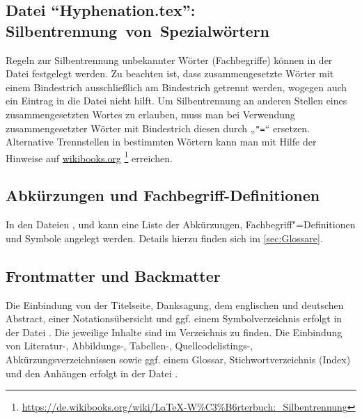 \subsection[Datei \enquote{Hyphenation.tex}: Silbentrennung von Spezialwörtern]{Datei \enquote{Hyphenation.tex}: \mbox{Silbentrennung von Spezialwörtern}}%
%
\label{sec:Hyphenation}
%
Regeln zur Silbentrennung unbekannter Wörter (\zB Fachbegriffe)
können in der Datei  festgelegt werden.
Zu beachten ist, dass zusammengesetzte Wörter mit einem Bindestrich
ausschließlich am Bindestrich getrennt werden,
wogegen auch ein Eintrag in die Datei  nicht hilft.
Um Silbentrennung an anderen Stellen eines zusammengesetzten Wortes zu erlauben,
muss man bei Verwendung zusammengesetzter Wörter mit Bindestrich diesen durch „\verb+"=+“ ersetzen.
Alternative Trennstellen in bestimmten Wörtern kann man mit Hilfe der Hinweise auf 
\href{https://de.wikibooks.org/wiki/LaTeX-W%C3%B6rterbuch:_Silbentrennung}{wikibooks.org}%
\footnote{\url{https://de.wikibooks.org/wiki/LaTeX-W%C3%B6rterbuch:_Silbentrennung}}
erreichen.


\subsection[Abkürzungen und Fachbegriff-Definitionen]{Abkürzungen und Fachbegriff-Definitionen}%
%
%
%
%
\label{sec:Abkuerzungen}
%
In den Dateien
,
 und
kann eine Liste der Abkürzungen, Fachbegriff"=Definitionen und Symbole angelegt werden.
Details hierzu finden sich im \cref{sec:Glossare}.


\subsection[Frontmatter und Backmatter]{Frontmatter und Backmatter}%
%
%
%
%
%
%
%
%
%
%
%
\label{sec:FrontmatterBackmatter}
%
Die Einbindung von der Titelseite, Danksagung, dem englischen und deutschen Abstract,
einer Notationsübersicht und ggf. einem Symbolverzeichnis
erfolgt in der Datei .
Die jeweilige Inhalte sind im Verzeichnis  zu finden.
Die Einbindung von Literatur-, Abbildungs-, Tabellen-, Quellcodelistings-, Abkürzungsverzeichnissen sowie ggf. einem Glossar, Stichwortverzeichnis (Index) und den Anhängen erfolgt in der Datei .
